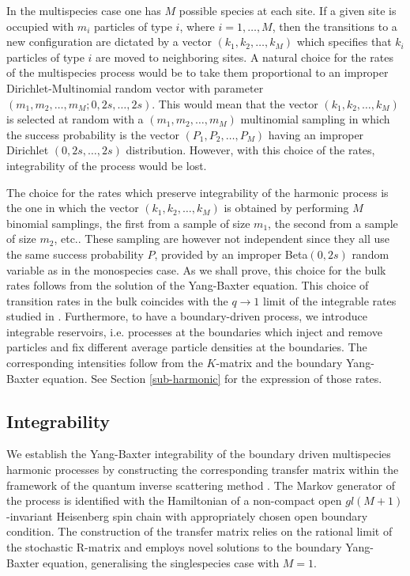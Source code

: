 \documentclass[11pt]{article}
\numberwithin{equation}{section}
\begin{document}
In the multispecies case one has $M$ possible species at each site.
If a given site is occupied with $m_i$ particles of type $i$, where $i=1,\ldots,M$, then the transitions to a new configuration are dictated by a vector $(k_1,k_2,\ldots,k_M)$ 
which specifies that $k_i$ particles of type $i$ are moved to neighboring sites. A natural choice for
the rates of the multispecies
process would be to take them proportional to an improper
Dirichlet-Multinomial random vector with parameter $(m_1,m_2,\ldots,m_M;0,2s,\ldots,2s)$. This would mean that the vector $(k_1,k_2,\ldots,k_M)$ is selected at random with a $(m_1,m_2,\ldots,m_M)$ multinomial sampling in which the success probability is the vector $(P_1,P_2,\ldots,P_M)$
having an improper Dirichlet $(0,2s,\ldots,2s)$ distribution. However, with this choice of the rates, integrability of the process would be lost.

The choice for the rates which preserve integrability of the harmonic process 
is the one in which 
the vector $(k_1,k_2,\ldots,k_M)$
is obtained by performing 
$M$ binomial samplings,
the first from a sample of size $m_1$, the second from a sample of size $m_2$, etc.. These sampling are however not independent since they all use the same success probability $P$, provided by
an improper Beta$(0,2s)$
random variable as in the monospecies case.
As we shall prove, this choice for the bulk rates follows from  the solution of the Yang-Baxter equation.
This choice of transition rates in the bulk coincides  with the $q\to1$ limit of the integrable rates studied in \cite{Kuniba:2016fpi,2018arXiv180801866B}.
Furthermore, to have a boundary-driven process, we introduce integrable reservoirs, i.e.
processes at the boundaries
which inject and remove particles and fix different average particle densities 
at the boundaries. 
The corresponding intensities follow from the $K$-matrix
and the boundary Yang-Baxter equation. See Section  \ref{sub-harmonic} for the expression of those rates.








\subsection{Integrability}


We establish the Yang-Baxter integrability of the boundary driven multispecies harmonic processes by constructing the corresponding transfer matrix within the framework of the quantum inverse scattering method \cite{Faddeev:1996iy,Sklyanin:1988yz}. The Markov generator of the process is identified with the Hamiltonian of a non-compact open $gl(M+1)$-invariant Heisenberg spin chain with appropriately chosen open boundary condition. The construction of the transfer matrix relies on the rational limit of the stochastic R-matrix \cite{Kuniba:2016fpi,Bosnjak:2016oze} and employs novel solutions to the boundary Yang-Baxter equation, generalising the singlespecies  case \cite{Frassek:2019vjt} with $M=1$.
\end{document}
